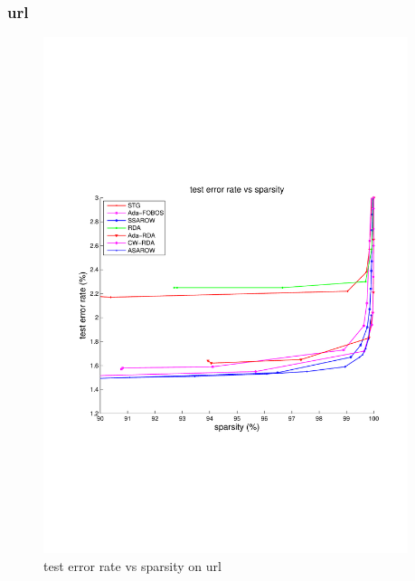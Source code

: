 \documentclass{article}
\begin{document}
\subsubsection{url}
\begin{figure}[!h]
\centering
\includegraphics[width=0.95\textwidth]{./figs/url_test.pdf}
\caption{test error rate vs sparsity on url}
\label{fig:03}
\end{figure}
\end{document}
